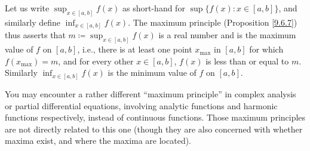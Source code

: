 \begin{note}
    Let us write \(\sup_{x \in [a, b]} f(x)\) as short-hand for \(\sup\{f(x) : x \in [a, b]\}\), and similarly define \(\inf_{x \in [a, b]} f(x)\).
    The maximum principle (Proposition \ref{9.6.7}) thus asserts that \(m \coloneqq \sup_{x \in [a, b]} f(x)\) is a real number and is the maximum value of \(f\) on \([a, b]\), i.e., there is at least one point \(x_{\max}\) in \([a, b]\) for which \(f(x_{\max}) = m\), and for every other \(x \in [a, b]\), \(f(x)\) is less than or equal to \(m\).
    Similarly \(\inf_{x \in [a, b]} f(x)\) is the minimum value of \(f\) on \([a, b]\).
\end{note}

\begin{remark}\label{9.6.9}
    You may encounter a rather different ``maximum principle'' in complex analysis or partial differential equations, involving analytic functions and harmonic functions respectively, instead of continuous functions.
    Those maximum principles are not directly related to this one
    (though they are also concerned with whether maxima exist, and where the maxima are located).
\end{remark}